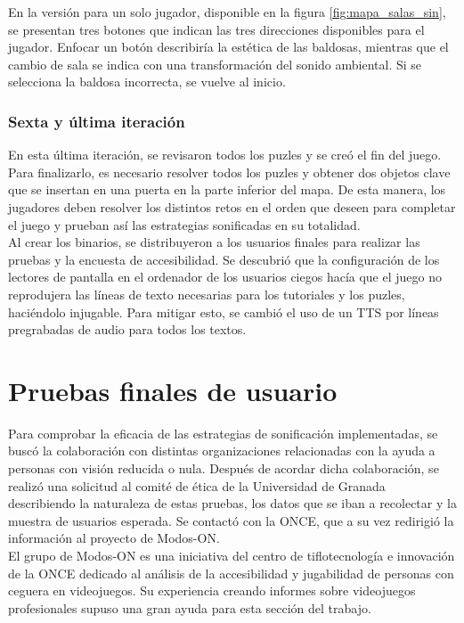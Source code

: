 En la versión para un solo jugador, disponible en la figura \ref{fig:mapa_salas_sin},  se presentan tres botones que indican las tres direcciones disponibles para el jugador. Enfocar un botón describiría la estética de las baldosas, mientras que el cambio de sala se indica con una transformación del sonido ambiental. Si se selecciona la baldosa incorrecta, se vuelve al inicio. \\

\subsubsection{Sexta y última iteración}
En esta última iteración, se revisaron todos los puzles y se creó el fin del juego. Para finalizarlo, es necesario resolver todos los puzles y obtener dos objetos clave que se insertan en una puerta en la parte inferior del mapa. De esta manera, los jugadores deben resolver los distintos retos en el orden que deseen para completar el juego y prueban así las estrategias sonificadas en su totalidad. \\

Al crear los binarios, se distribuyeron a los usuarios finales para realizar las pruebas y la encuesta de accesibilidad. Se descubrió que la configuración de los lectores de pantalla en el ordenador de los usuarios ciegos hacía que el juego no reprodujera las líneas de texto necesarias para los tutoriales y los puzles, haciéndolo injugable. Para mitigar esto, se cambió el uso de un TTS por líneas pregrabadas de audio para todos los textos. \\
\section{Pruebas finales de usuario}
Para comprobar la eficacia de las estrategias de sonificación implementadas, se buscó la colaboración con distintas organizaciones relacionadas con la ayuda a personas con visión reducida o nula. Después de acordar dicha colaboración, se realizó una solicitud al comité de ética de la Universidad de Granada describiendo la naturaleza de estas pruebas, los datos que se iban a recolectar y la muestra de usuarios esperada. Se contactó con la ONCE, que a su vez redirigió la información al proyecto de Modos-ON.\\

El grupo de Modos-ON \cite{BienvenidosModosONActivando} es una iniciativa del centro de tiflotecnología e innovación de la ONCE dedicado al análisis de la accesibilidad y jugabilidad de personas con ceguera en videojuegos. Su experiencia creando informes sobre videojuegos profesionales supuso una gran ayuda para esta sección del trabajo. \\

